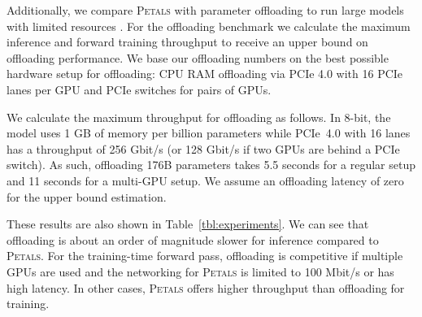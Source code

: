 Additionally, we compare \textsc{Petals} with parameter offloading to run large models with limited resources \citep{zerooffload,rajbhandari2021zero}. For the offloading benchmark we calculate the maximum inference and forward training throughput to receive an upper bound on offloading performance. We base our offloading numbers on the best possible hardware setup for offloading: CPU RAM offloading via PCIe 4.0 with 16 PCIe lanes per GPU and PCIe switches for pairs of GPUs.

We calculate the maximum throughput for offloading as follows. In 8-bit, the model uses 1 GB of memory per billion parameters while PCIe~4.0 with 16 lanes has a throughput of 256 Gbit/s (or 128 Gbit/s if two GPUs are behind a PCIe switch). As such, offloading 176B parameters takes 5.5 seconds for a regular setup and 11 seconds for a multi-GPU setup. We assume an offloading latency of zero for the upper bound estimation.

These results are also shown in Table~\ref{tbl:experiments}. We can see that offloading is about an order of magnitude slower for inference compared to \textsc{Petals}. For the training-time forward pass, offloading is competitive if multiple GPUs are used and the networking for \textsc{Petals} is limited to 100 Mbit/s or has high latency. In other cases, \textsc{Petals} offers higher throughput than offloading for training.